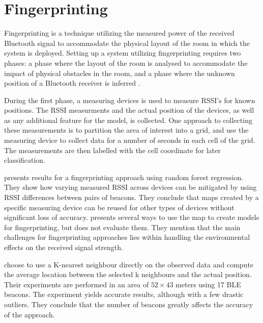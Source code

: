 \section{Fingerprinting}
Fingerprinting is a technique utilizing the measured power of the received Bluetooth signal to accommodate the physical layout of the room in which the system is deployed. 
Setting up a system utilizing fingerprinting requires two phases: a phase where the layout of the room is analysed to accommodate the impact of physical obstacles in the room, and a phase where the unknown position of a Bluetooth receiver is inferred \cite{presence_ble_review, taking_localization_to_the_wild}.

During the first phase, a measuring devices is used to measure RSSI's for known positions.
The RSSI measurments and the actual position of the devices, as well as any additional feature for the model, is collected. 
One approach to collecting these measurements is to partition the area of interest into a grid, and use the measuring device to collect data for a number of seconds in each cell of the grid.\cite{improving_indoor_localization}
The measurements are then labelled with the cell coordinate for later classification. 

\citeauthor{taking_localization_to_the_wild} \cite{taking_localization_to_the_wild} presents results for a fingerprinting approach using random forest regression.
They show how varying measured RSSI across devices can be mitigated by using RSSI differences between pairs of beacons.
They conclude that maps created by a specific measuring device can be reused for other types of devices without significant loss of accuracy. 
\citeauthor{presence_ble_review}\cite{presence_ble_review} presents several ways to use the map to create models for fingerprinting, but does not evaluate them.
They mention that the main challenges for fingerprinting approaches lies within handling the environmental effects on the received signal strength.

\citeauthor{improving_indoor_localization} \cite{improving_indoor_localization} choose to use a K-nearest neighbour directly on the observed data and compute the average location between the selected k neighbours and the actual position. 
Their experiments are performed in an area of $52\times43$ meters using 17 BLE beacons.
The experiment yields accurate results, although with a few drastic outliers. 
They conclude that the number of beacons greatly affects the accuracy of the approach.

